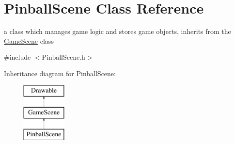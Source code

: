\hypertarget{class_pinball_scene}{\section{Pinball\+Scene Class Reference}
\label{class_pinball_scene}
}


a class which manages game logic and stores game objects, inherits from the \hyperlink{class_game_scene}{Game\+Scene} class  




{\ttfamily \#include $<$Pinball\+Scene.\+h$>$}

Inheritance diagram for Pinball\+Scene\+:\begin{figure}[H]
\begin{center}
\leavevmode
\includegraphics[height=3.000000cm]{class_pinball_scene}
\end{center}
\end{figure}
